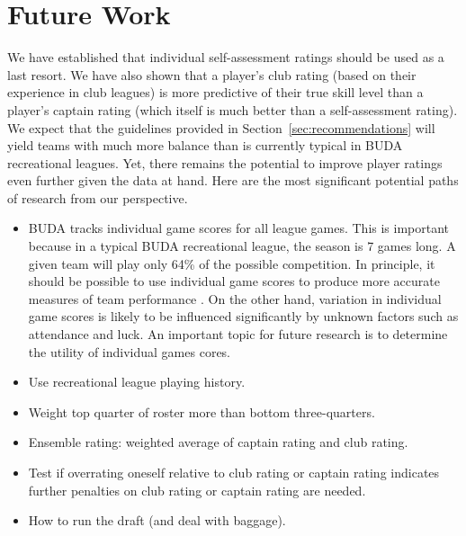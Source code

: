 \section{Future Work}\label{sec:summary}

We have established that individual self-assessment ratings should be used as a last resort. We have also shown that a player's club rating (based on their experience in club leagues) is more predictive of their true skill level than a player's captain rating (which itself is much better than a self-assessment rating). We expect that the guidelines provided in Section~\ref{sec:recommendations} will yield teams with much more balance than is currently typical in BUDA recreational leagues. Yet, there remains the potential to improve player ratings even further given the data at hand. Here are the most significant potential paths of research from our perspective.

\begin{itemize}

\item BUDA tracks individual game scores for all league games. This is important because in a typical BUDA recreational league, the season is 7 games long. A given team will play only 64\% of the possible competition. In principle, it should be possible to use individual game scores to produce more accurate measures of team performance \cite{Langville_2012}. On the other hand, variation in individual game scores is likely to be influenced significantly by unknown factors such as attendance and luck. An important topic for future research is to determine the utility of individual games cores.

\item Use recreational league playing history.

\item Weight top quarter of roster more than bottom three-quarters.

\item Ensemble rating: weighted average of captain rating and club rating.

\item Test if overrating oneself relative to club rating or captain rating indicates further penalties on club rating or captain rating are needed.

\item How to run the draft (and deal with baggage).

\end{itemize}